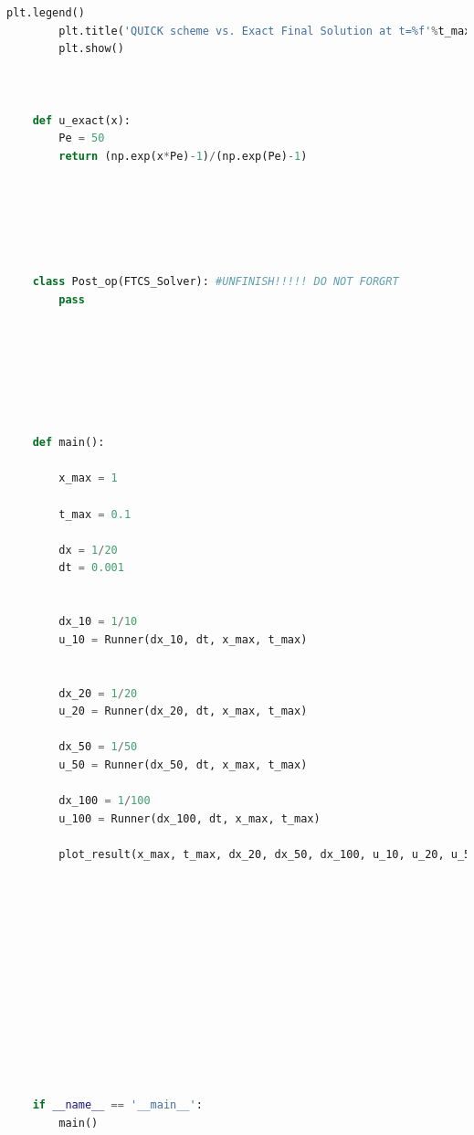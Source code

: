 \documentclass[12pt]{article}
\begin{document}
\begin{scriptsize}
\begin{lstlisting}[language=python,caption={Problem2, QUICK Solver updated}]
        plt.legend()
        plt.title('QUICK scheme vs. Exact Final Solution at t=%f'%t_max)
        plt.show()
    
    
    
    def u_exact(x):
        Pe = 50
        return (np.exp(x*Pe)-1)/(np.exp(Pe)-1)
    
    
    
        
    
    
    class Post_op(FTCS_Solver): #UNFINISH!!!!! DO NOT FORGRT
        pass
    
            
    
    
    
    
    
    def main():
    
        x_max = 1
    
        t_max = 0.1
    
        dx = 1/20
        dt = 0.001
    
    
        dx_10 = 1/10
        u_10 = Runner(dx_10, dt, x_max, t_max)
    
    
        dx_20 = 1/20
        u_20 = Runner(dx_20, dt, x_max, t_max)
    
        dx_50 = 1/50
        u_50 = Runner(dx_50, dt, x_max, t_max)
    
        dx_100 = 1/100
        u_100 = Runner(dx_100, dt, x_max, t_max)
    
        plot_result(x_max, t_max, dx_20, dx_50, dx_100, u_10, u_20, u_50, u_100)
    
    
    
    
    
        
    
    
    
    
    
    
    
    if __name__ == '__main__':
        main()
    
    
    
    
    
    
    
    
    
    
    
    
    
    

\end{lstlisting}





\end{scriptsize}




\end{document}
